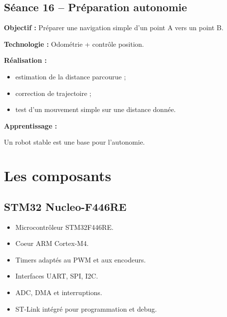 \documentclass[11pt,a4paper]{article}
\begin{document}
	\subsection*{Séance 16 -- Préparation autonomie}
	
	\begin{sessionbox}
		
		\textbf{Objectif :} Préparer une navigation simple d'un point A vers un point B.
		
		\vspace{0.3cm}
		
		\textbf{Technologie :} Odométrie + contrôle position.
		
		\vspace{0.3cm}
		
		\textbf{Réalisation :}
		
		\begin{itemize}
			\item estimation de la distance parcourue ;
			\item correction de trajectoire ;
			\item test d'un mouvement simple sur une distance donnée.
		\end{itemize}
		
		\vspace{0.3cm}
		
		\textbf{Apprentissage :}
		
		Un robot stable est une base pour l'autonomie.
		
	\end{sessionbox}
	
	\section{Les composants}
	
	\subsection*{STM32 Nucleo-F446RE}
	
	\begin{componentbox}
		\begin{itemize}
			\item Microcontrôleur STM32F446RE.
			\item Coeur ARM Cortex-M4.
			\item Timers adaptés au PWM et aux encodeurs.
			\item Interfaces UART, SPI, I2C.
			\item ADC, DMA et interruptions.
			\item ST-Link intégré pour programmation et debug.
		\end{itemize}
	\end{componentbox}
	
\end{document}
